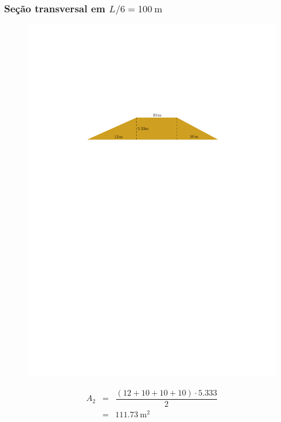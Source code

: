 \documentclass[a4paper, 12pt, brazilian]{article}
\begin{document}
	\subsubsection{Seção transversal em $L/6=\SI{100}{\meter}$}
	\begin{figure}[H]
		\centering
		\includegraphics[width=0.9\linewidth]{images/lpersix}
		\label{fig:lpersix}
	\end{figure}
	
	
	\begin{eqnarray}
		A_{2}&=&\dfrac{(12+10+10+10)\cdot 5.333}{2}\\
		&=&\SI{111.73}{\meter^{2}}
	\end{eqnarray}
	
\end{document}
